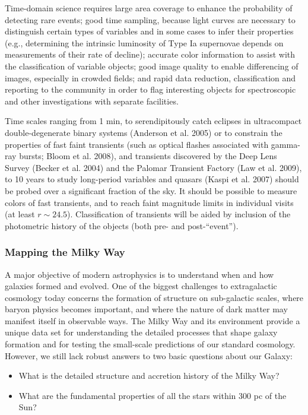 \documentclass{emulateapj}
\newcommand{\B}[1]{{#1}}
\begin{document}
Time-domain science requires large area coverage to enhance the probability 
of detecting rare events; good time sampling, because light curves are necessary 
to distinguish certain types of variables and in some cases to infer their
properties (e.g., determining the intrinsic luminosity of Type Ia supernovae 
depends on measurements of their rate of decline); accurate color information 
to assist with the classification of variable objects; good image quality 
to enable differencing of images, especially in crowded fields; and rapid data 
reduction, classification and reporting to the community in order to flag 
interesting objects for spectroscopic and other investigations with separate 
facilities. 

Time scales ranging from 1 min, to serendipitously catch eclipses in ultracompact 
double-degenerate binary systems (Anderson et al. 2005) or  to constrain the properties 
of fast faint transients (such as optical flashes associated with gamma-ray
bursts; Bloom et al. 2008), and transients discovered by the Deep Lens
Survey (Becker et al. 2004) and the Palomar Transient Factory (Law et al. 2009), 
to 10 years to study long-period variables and quasars (Kaspi et al. 2007) should 
be probed over a significant fraction of the sky. It should be possible to measure 
colors of fast transients, and to reach faint magnitude limits in individual visits 
(at least $r\sim24.5$). 
Classification of transients will be aided by inclusion of the photometric
history of the objects (both pre- and post-``event''). 

\subsubsection{ Mapping the Milky Way}

A major objective of modern astrophysics is to understand when and how galaxies 
formed and evolved. 
One of the biggest challenges to extragalactic cosmology today 
concerns the formation of structure on sub-galactic scales, where baryon physics 
becomes important, and where the nature of dark matter may manifest itself in 
observable ways.  The Milky Way and its environment provide a unique data set for 
understanding the detailed processes that shape galaxy formation and for testing
the small-scale predictions of our standard cosmology. However, we still lack robust 
answers to two basic questions about our Galaxy: 
\begin{itemize}
\item What is the detailed structure and accretion history of the Milky Way? 
\item What are the fundamental properties of all the stars within 300 pc of the Sun? 
\end{itemize}
\end{document}
